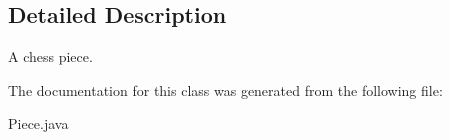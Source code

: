 \subsection{Detailed Description}
A chess piece. 

The documentation for this class was generated from the following file:\begin{DoxyCompactItemize}
\item 
Piece.java\end{DoxyCompactItemize}
